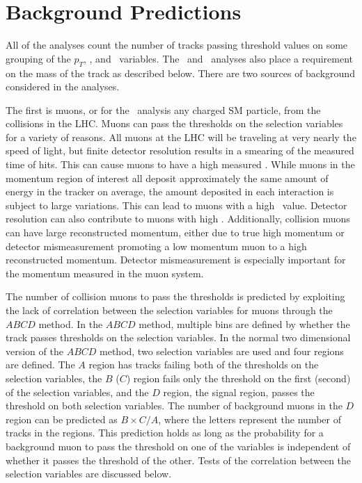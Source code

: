 \section{Background Predictions \label{BackPred}}
All of the analyses count the number of tracks passing threshold values on some grouping of the $p_T$, \invbeta, 
and \ias\ variables. The \tktof\  and \tkonly\ analyses also place a requirement on the mass of the track as described below. There are two sources
of background considered in the analyses. 

The first is muons, or for the \tkonly\ analysis any charged SM particle, from the collisions in the LHC. Muons can pass the thresholds on the selection variables
for a variety of reasons.
All muons at the LHC will be traveling at very nearly the speed of light,
but finite detector resolution results in a smearing of the measured time of hits. This can cause muons to have a high measured \invbeta.
While muons in the momentum region of interest all deposit approximately
the same amount of energy in the tracker on average, the amount deposited in each interaction is subject to large variations. This can lead to muons
with a high \dedx\ value. Detector resolution can also contribute to muons with high \dedx.
Additionally, collision muons can have large reconstructed momentum, either due to true high momentum or detector mismeasurement
promoting a low momentum muon to a high reconstructed momentum. Detector mismeasurement is especially important for the momentum measured in the muon system.

The number of collision muons to pass the thresholds is predicted by exploiting the lack of correlation between the selection variables for muons through the $ABCD$ method.
In the $ABCD$ method, multiple bins are defined by whether the track passes thresholds on the selection variables. In the normal two dimensional version
of the $ABCD$ method, two selection variables are used and four regions are defined. The $A$ region has tracks failing both of the thresholds on the selection
variables, the $B$ ($C$) region fails only the threshold on the first (second) of the selection variables, and the $D$ region,
the signal region, passes the threshold on both selection
variables. The number of background muons in the $D$ region can be predicted as $B \times C / A$, where the letters represent the number of tracks in the regions.
This prediction holds as long as the probability for a background
muon to pass the threshold on one of the variables is independent of whether it passes the threshold of the other. Tests of the correlation between the selection variables are
discussed below.

